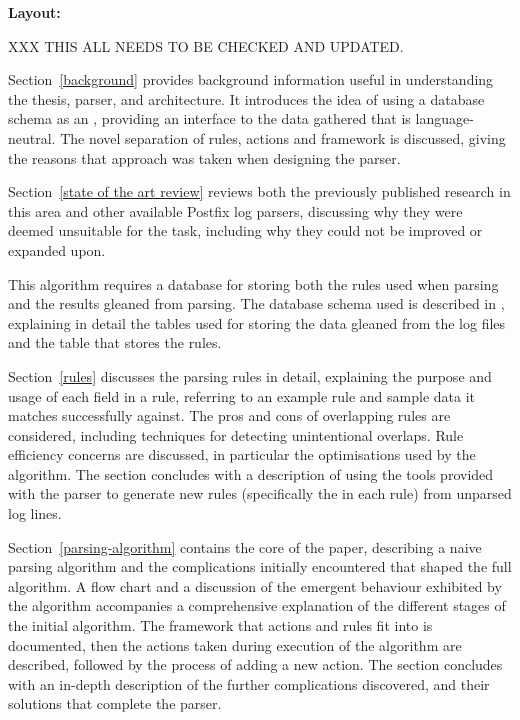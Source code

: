 \vspace{1em}\noindent\textbf{Layout:}

XXX THIS ALL NEEDS TO BE CHECKED AND UPDATED\@.

Section~\ref{background} provides background information useful in
understanding the thesis, parser, and architecture.  It introduces the idea
of using a database schema as an \API{}, providing an interface to the data
gathered that is language-neutral.  The novel separation of rules, actions
and framework is discussed, giving the reasons that approach was taken when
designing the parser.

Section~\ref{state of the art review} reviews both the previously published
research in this area and other available Postfix log parsers, discussing
why they were deemed unsuitable for the task, including why they could not
be improved or expanded upon.

This algorithm requires a database for storing both the rules used when
parsing and the results gleaned from parsing.  The database schema used is
described in , explaining in detail the tables
used for storing the data gleaned from the log files and the table that
stores the rules.

Section~\ref{rules} discusses the parsing rules in detail, explaining the
purpose and usage of each field in a rule, referring to an example rule and
sample data it matches successfully against.  The pros and cons of
overlapping rules are considered, including techniques for detecting
unintentional overlaps.  Rule efficiency concerns are discussed, in
particular the optimisations used by the algorithm.  The section concludes
with a description of using the tools provided with the parser to generate
new rules (specifically the \regex{} in each rule) from unparsed log lines.

Section~\ref{parsing-algorithm} contains the core of the paper, describing
a naive parsing algorithm and the complications initially encountered that
shaped the full algorithm.  A flow chart and a discussion of the emergent
behaviour exhibited by the algorithm accompanies a comprehensive
explanation of the different stages of the initial algorithm.  The
framework that actions and rules fit into is documented, then the actions
taken during execution of the algorithm are described, followed by the
process of adding a new action.  The section concludes with an in-depth
description of the further complications discovered, and their solutions
that complete the parser.

